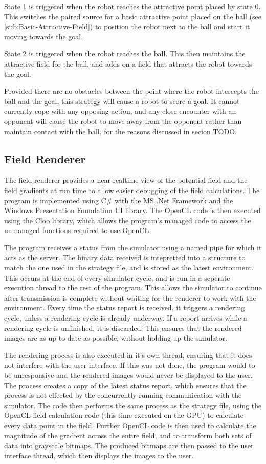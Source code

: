 \documentclass[10pt]{article} \usepackage[a4paper]{geometry}
\begin{document}
State 1 is triggered when the robot reaches the attractive point placed by state
0.  This switches the paired source for a basic attractive point placed on the
ball (see \ref{sub:Basic-Attractive-Field}) to position the robot next to the
ball and start it moving towards the goal.

State 2 is triggered when the robot reaches the ball.  This then maintains the
attractive field for the ball, and adds on a field that attracts the robot
towards the goal.

Provided there are no obstacles between the point where the robot intercepts the
ball and the goal, this strategy will cause a robot to score a goal.  It cannot
currently cope with any opposing action, and any close encounter with an
opponent will cause the robot to move away from the opponent rather than
maintain contact with the ball, for the reasons discussed in secion TODO.

\subsection{Field Renderer}

The field renderer provides a near realtime view of the potential field and the
field gradients at run time to allow easier debugging of the field calculations.
The program is implemented using C\# with the MS .Net Framework and the Windows
Presentation Foundation UI library. The OpenCL code is then executed using the
Cloo library, which allows the program's managed code to access the unmanaged
functions required to use OpenCL.

The program receives a status from the simulator using a named pipe for which it
acts as the server. The binary data received is intepretted into a structure to
match the one used in the strategy file, and is stored as the latest
environment. This occurs at the end of every simulator cycle, and is run in a
seperate execution thread to the rest of the program. This allows the simulator
to continue after transmission is complete without waiting for the renderer to
work with the environment. Every time the status report is received, it triggers
a rendering cycle, unless a rendering cycle is already underway. If a report
arrives while a rendering cycle is unfinished, it is discarded. This ensures
that the rendered images are as up to date as possible, without holding up the
simulator.

The rendering process is also executed in it's own thread, ensuring that it does
not interfere with the user interface. If this was not done, the program would
to be unresponsive and the rendered images would never be displayed to the user.
The process creates a copy of the latest status report, which ensures that the
process is not effected by the concurrently running communication with the
simulator. The code then performs the same process as the strategy file, using
the OpenCL field calculation code (this time executed on the \ac{GPU}) to
calculate every data point in the field. Further OpenCL code is then used to
calculate the magnitude of the gradient across the entire field, and to
transform both sets of data into grayscale bitmaps. The produced bitmaps are
then passed to the user interface thread, which then displays the images to the
user.
\end{document}
